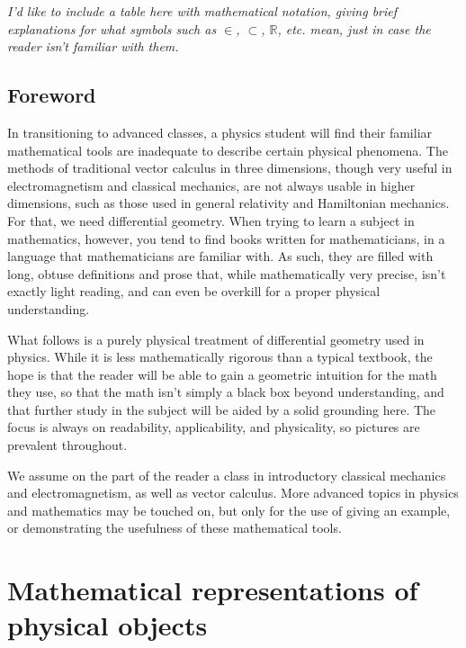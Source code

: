 \documentclass{book}
\begin{document}
\tableofcontents

\emph{I'd like to include a table here with mathematical notation, giving brief explanations for what symbols such as $\in$, $\subset$, $\mathbb{R}$, etc. mean, just in case the reader isn't familiar with them.}

\clearpage






\section{Foreword}
In transitioning to advanced classes, a physics student will find their familiar mathematical tools are inadequate to describe certain physical phenomena. The methods of traditional vector calculus in three dimensions, though very useful in electromagnetism and classical mechanics, are not always usable in higher dimensions, such as those used in general relativity and Hamiltonian mechanics. For that, we need differential geometry. When trying to learn a subject in mathematics, however, you tend to find books written for mathematicians, in a language that mathematicians are familiar with. As such, they are filled with long, obtuse definitions and prose that, while mathematically very precise, isn't exactly light reading, and can even be overkill for a proper physical understanding. 

What follows is a purely physical treatment of differential geometry used in physics. While it is less mathematically rigorous than a typical textbook, the hope is that the reader will be able to gain a geometric intuition for the math they use, so that the math isn't simply a black box beyond understanding, and that further study in the subject will be aided by a solid grounding here. The focus is always on readability, applicability, and physicality, so pictures are prevalent throughout. 

We assume on the part of the reader a class in introductory classical mechanics and electromagnetism, as well as vector calculus. More advanced topics in physics and mathematics may be touched on, but only for the use of giving an example, or demonstrating the usefulness of these mathematical tools. 


\chapter{Mathematical representations of physical objects}
\end{document}
